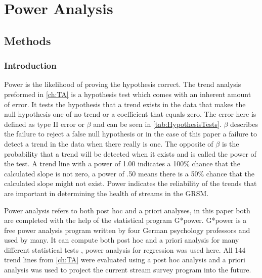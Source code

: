 \chapter{Power Analysis} \label{ch:poweranslysis}

\section{Methods}

\subsection{Introduction}

Power is the likelihood of proving the hypothesis correct.
The trend analysis  preformed in \autoref{ch:TA} is a hypothesis test which comes with an inherent amount of error.  
It tests the hypothesis that a trend exists in the data that makes the null hypothesis one of no trend or a coefficient that equals zero.
The error here is defined as type II error or $\beta$ and can be seen in \autoref{tab:HypothesisTests}.
$\beta$ describes the failure to reject a false null hypothesis or in the case of this paper a failure to detect a trend in the data when there really is one.
The opposite of $\beta$ is the probability that a trend will be detected when it exists and is called the power of the test.
A trend line with a power of 1.00 indicates a 100$\%$ chance that the calculated slope is not zero, a power of .50 means there is a 50$\%$ chance that the calculated slope might not exist.
Power indicates the reliability of the trends that are important in determining the health of streams in the GRSM.



Power analysis refers to both  post hoc and a priori analyses, in this paper both are completed with the help of the statistical program G*power.
G*power is a free power analysis program written by four German psychology professors and used by many.
It can compute both post hoc and a priori analysis for many different statistical tests \citep{faul2009statistical}, power analysis for regression was used here.
All 144 trend lines from \autoref{ch:TA} were evaluated using a post hoc analysis and a priori analysis was used to project the current stream survey program into the future.

